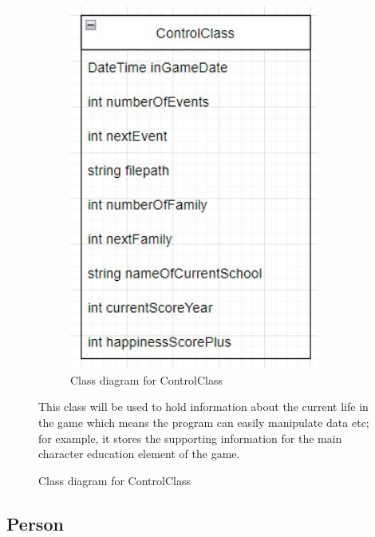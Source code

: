 \begin{figure} [H]
    \centering
    \begin{minipage}{0.45\textwidth}
        \begin{figure}[H]
        \centering
        \includegraphics[width=0.9\textwidth]{images/design/class-controlClass.jpg}
        \caption{Class diagram for ControlClass}
        \label{fig:design-class-controlClass}
        \end{figure}
    \end{minipage} \hfill
    \begin{minipage}{0.45\textwidth}
    This class will be used to hold information about the current life in the game which means the program can easily manipulate data etc; for example, it stores the supporting information for the main character education element of the game.
    \end{minipage}
\end{figure}

\subsection{Person}

